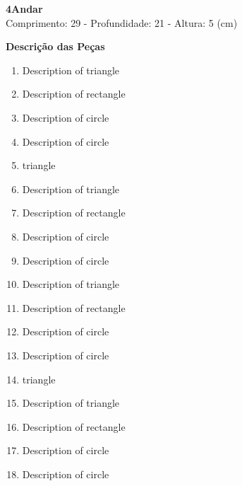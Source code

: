 \documentclass[a4paper,landscape]{article}
\begin{document}
\newpage\clearpage
\thispagestyle{empty}
\begin{center} 
\large\textbf{4\degree Andar}\\
\vspace*{5px} 
\large
\textmd{Comprimento: 29  -  Profundidade: 21  -  Altura: 5 (cm)}\\ \end{center}
\centering
{}%
\newpage\clearpage\thispagestyle{empty}
\begin{center} 
\large
\textbf{Descrição das Peças}\\\vspace*{10px} 
 \end{center}\begin{enumerate}\item Description of triangle
\item Description of rectangle
\item Description of circle
\item Description of circle
\item triangle
\item Description of triangle
\item Description of rectangle
\item Description of circle
\item Description of circle
\item Description of triangle
\item Description of rectangle
\item Description of circle
\item Description of circle
\item triangle
\item Description of triangle
\item Description of rectangle
\item Description of circle
\item Description of circle
\end{enumerate}
\end{document}
